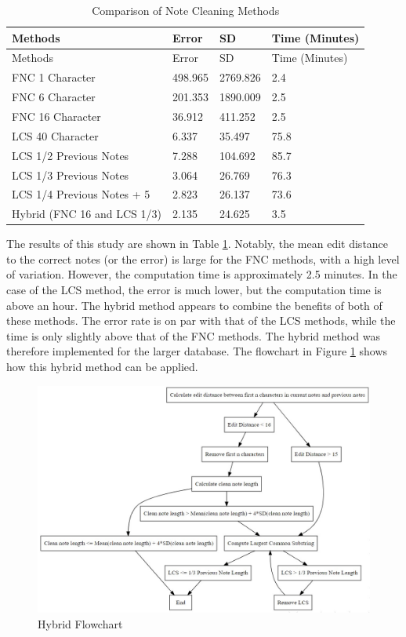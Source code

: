 \documentclass[print]{nuthesis}
\begin{document}
\begin{longtable}[]{@{}llll@{}}
\caption{Comparison of Note Cleaning Methods \label{tab:cleancompare}}\tabularnewline
\toprule\noalign{}
Methods & Error & SD & Time (Minutes) \\
\midrule\noalign{}
\endfirsthead
\toprule\noalign{}
Methods & Error & SD & Time (Minutes) \\
\midrule\noalign{}
\endhead
\bottomrule\noalign{}
\endlastfoot
FNC 1 Character & 498.965 & 2769.826 & 2.4 \\
FNC 6 Character & 201.353 & 1890.009 & 2.5 \\
FNC 16 Character & 36.912 & 411.252 & 2.5 \\
LCS 40 Character & 6.337 & 35.497 & 75.8 \\
LCS 1/2 Previous Notes & 7.288 & 104.692 & 85.7 \\
LCS 1/3 Previous Notes & 3.064 & 26.769 & 76.3 \\
LCS 1/4 Previous Notes + 5 & 2.823 & 26.137 & 73.6 \\
Hybrid (FNC 16 and LCS 1/3) & 2.135 & 24.625 & 3.5 \\
\end{longtable}

The results of this study are shown in Table \ref{tab:cleancompare}.
Notably, the mean edit distance to the correct notes (or the error) is large for the FNC methods, with a high level of variation.
However, the computation time is approximately 2.5 minutes.
In the case of the LCS method, the error is much lower, but the computation time is above an hour.
The hybrid method appears to combine the benefits of both of these methods.
The error rate is on par with that of the LCS methods, while the time is only slightly above that of the FNC methods.
The hybrid method was therefore implemented for the larger database.
The flowchart in Figure \ref{fig:flowchart} shows how this hybrid method can be applied.

\begin{figure}

{\centering \includegraphics[width=\linewidth]{images/flowchart} 

}

\caption{Hybrid Flowchart}\label{fig:flowchart}
\end{figure}
\end{document}
